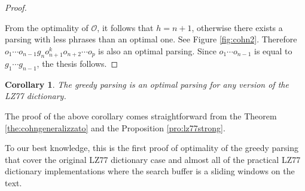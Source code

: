\documentclass[12pt]{article}
\theoremstyle{plain}
\newtheorem{corollary}[theorem]{Corollary}
\theoremstyle{definition}
\theoremstyle{remark}
\begin{document}
\begin{proof}
\begin{figure}[t] \end{figure}




From the optimality of $\mathcal{O}$, it follows that $h=n+1$, otherwise there exists a parsing with less phrases than an optimal one. See Figure \ref{fig:cohn2}.
Therefore $o_1 \cdots o_{n-1} g_n o_{n+1}^k o_{n+2} \cdots  o_p$  is also  an optimal parsing. 
Since $o_1 \cdots o_{n-1}$ is equal to $g_1 \cdots g_{n-1}$, the thesis follows.
\end{proof}


\begin{corollary}
The greedy parsing is an optimal parsing for any version of the LZ77 dictionary.
\end{corollary}
The proof of the above corollary comes straightforward from the Theorem  \ref{the:cohngeneralizzato} and the Proposition \ref{pro:lz77strong}.

\medskip

To our best knowledge, this is the first proof of optimality of the greedy parsing that cover the original LZ77 dictionary case and almost all of the practical LZ77 dictionary implementations where the search buffer is a sliding windows on the text.





\end{document}
